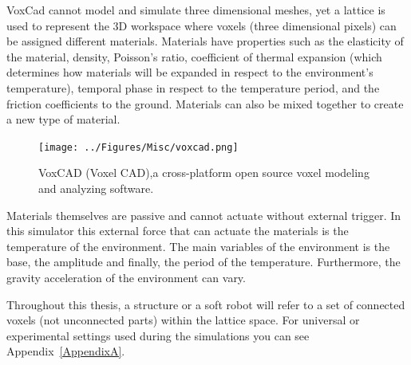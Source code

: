 VoxCad cannot model and simulate three dimensional meshes, yet a lattice is used to represent the 3D workspace where voxels (three dimensional pixels) can be assigned different materials. Materials have properties such as the elasticity of the material, density, Poisson's ratio, coefficient of thermal expansion (which determines how materials will be expanded in respect to the environment's temperature), temporal phase in respect to the temperature period, and the friction coefficients to the ground. Materials can also be mixed together to create a new type of material.

\begin{figure}[t!]
\centering
\texttt{[image: ../Figures/Misc/voxcad.png]}
\caption{VoxCAD (Voxel CAD),a cross-platform open source voxel modeling and analyzing software.}
\label{fig:VoxCAD}
\end{figure}

Materials themselves are passive and cannot actuate without external trigger. In this simulator this external force that can actuate the materials is the temperature of the environment. The main variables of the environment is the base, the amplitude and finally, the period of the temperature. Furthermore, the gravity acceleration of the environment can vary.

Throughout this thesis, a structure or a soft robot will refer to a set of connected voxels (not unconnected parts) within the lattice space. For universal or experimental settings used during the simulations you can see Appendix~\ref{AppendixA}.

